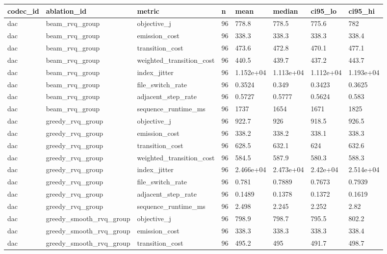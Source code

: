 \begin{table}[t]
\centering
\small
\begin{tabular}{llllllll}
\toprule
codec\_id & ablation\_id & metric & n & mean & median & ci95\_lo & ci95\_hi \\
\midrule
dac & beam\_rvq\_group & objective\_j & 96 & 778.8 & 778.5 & 775.6 & 782 \\
dac & beam\_rvq\_group & emission\_cost & 96 & 338.3 & 338.3 & 338.3 & 338.4 \\
dac & beam\_rvq\_group & transition\_cost & 96 & 473.6 & 472.8 & 470.1 & 477.1 \\
dac & beam\_rvq\_group & weighted\_transition\_cost & 96 & 440.5 & 439.7 & 437.2 & 443.7 \\
dac & beam\_rvq\_group & index\_jitter & 96 & 1.152e+04 & 1.113e+04 & 1.112e+04 & 1.193e+04 \\
dac & beam\_rvq\_group & file\_switch\_rate & 96 & 0.3524 & 0.349 & 0.3423 & 0.3625 \\
dac & beam\_rvq\_group & adjacent\_step\_rate & 96 & 0.5727 & 0.5777 & 0.5624 & 0.583 \\
dac & beam\_rvq\_group & sequence\_runtime\_ms & 96 & 1737 & 1654 & 1671 & 1825 \\
dac & greedy\_rvq\_group & objective\_j & 96 & 922.7 & 926 & 918.5 & 926.5 \\
dac & greedy\_rvq\_group & emission\_cost & 96 & 338.2 & 338.2 & 338.1 & 338.3 \\
dac & greedy\_rvq\_group & transition\_cost & 96 & 628.5 & 632.1 & 624 & 632.6 \\
dac & greedy\_rvq\_group & weighted\_transition\_cost & 96 & 584.5 & 587.9 & 580.3 & 588.3 \\
dac & greedy\_rvq\_group & index\_jitter & 96 & 2.466e+04 & 2.473e+04 & 2.42e+04 & 2.514e+04 \\
dac & greedy\_rvq\_group & file\_switch\_rate & 96 & 0.781 & 0.7889 & 0.7673 & 0.7939 \\
dac & greedy\_rvq\_group & adjacent\_step\_rate & 96 & 0.1489 & 0.1378 & 0.1372 & 0.1619 \\
dac & greedy\_rvq\_group & sequence\_runtime\_ms & 96 & 2.498 & 2.245 & 2.252 & 2.82 \\
dac & greedy\_smooth\_rvq\_group & objective\_j & 96 & 798.9 & 798.7 & 795.5 & 802.2 \\
dac & greedy\_smooth\_rvq\_group & emission\_cost & 96 & 338.3 & 338.3 & 338.3 & 338.4 \\
dac & greedy\_smooth\_rvq\_group & transition\_cost & 96 & 495.2 & 495 & 491.7 & 498.7 \\

\end{tabular}
\end{table}
